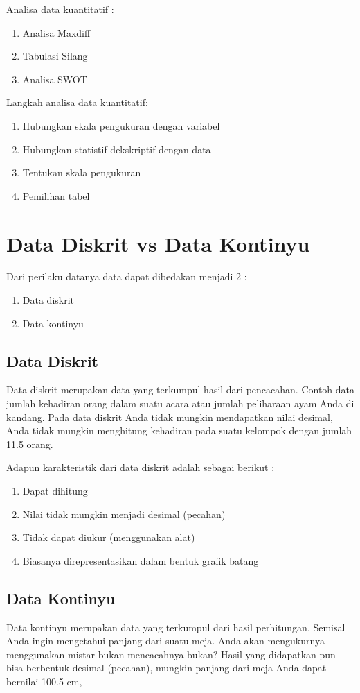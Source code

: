 Analisa data kuantitatif :
\begin{enumerate}
	\item Analisa Maxdiff 
	\item Tabulasi Silang
	\item Analisa SWOT
\end{enumerate}

Langkah analisa data kuantitatif:
\begin{enumerate}
	\item Hubungkan skala pengukuran dengan variabel
	\item Hubungkan statistif dekskriptif dengan data
	\item Tentukan skala pengukuran 
	\item Pemilihan tabel 
\end{enumerate}

\section{Data Diskrit vs Data Kontinyu}
Dari perilaku datanya data dapat dibedakan menjadi 2 :
\begin{enumerate}
	\item Data diskrit
	\item Data kontinyu
\end{enumerate}

\subsection{Data Diskrit}
Data diskrit merupakan data yang terkumpul hasil dari pencacahan. Contoh data jumlah kehadiran  orang dalam suatu acara atau jumlah peliharaan ayam Anda di kandang. Pada data diskrit Anda tidak mungkin mendapatkan nilai desimal, Anda tidak mungkin menghitung kehadiran pada suatu kelompok dengan jumlah 11.5 orang.

Adapun karakteristik dari data diskrit adalah sebagai berikut :
\begin{enumerate}
	\item Dapat dihitung
	\item Nilai tidak mungkin menjadi desimal (pecahan)
	\item Tidak dapat diukur (menggunakan alat)
	\item Biasanya direpresentasikan dalam bentuk grafik batang
\end{enumerate}

\subsection{Data Kontinyu}
Data kontinyu merupakan data yang terkumpul dari hasil perhitungan. Semisal Anda ingin mengetahui panjang dari suatu meja. Anda akan mengukurnya menggunakan mistar bukan mencacahnya bukan? Hasil yang didapatkan pun bisa berbentuk desimal (pecahan), mungkin panjang dari meja Anda dapat bernilai 100.5 cm,

